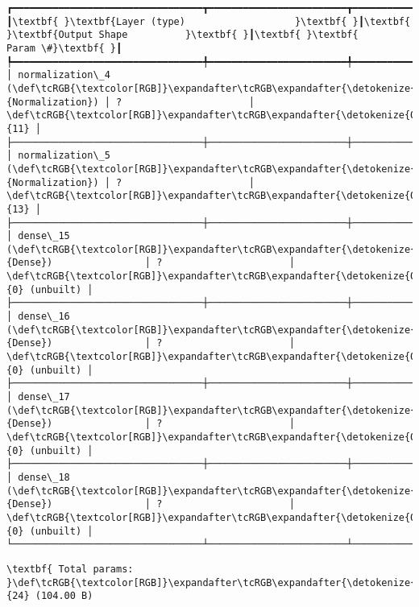 \documentclass[12pt letter]{report}
\begin{document}
    \begin{Verbatim}[commandchars=\\\{\}]
┏━━━━━━━━━━━━━━━━━━━━━━━━━━━━━━━━━┳━━━━━━━━━━━━━━━━━━━━━━━━┳━━━━━━━━━━━━━━━┓
┃\textbf{ }\textbf{Layer (type)                   }\textbf{ }┃\textbf{ }\textbf{Output Shape          }\textbf{ }┃\textbf{ }\textbf{      Param \#}\textbf{ }┃
┡━━━━━━━━━━━━━━━━━━━━━━━━━━━━━━━━━╇━━━━━━━━━━━━━━━━━━━━━━━━╇━━━━━━━━━━━━━━━┩
│ normalization\_4 (\def\tcRGB{\textcolor[RGB]}\expandafter\tcRGB\expandafter{\detokenize{0,135,255}}{Normalization}) │ ?                      │            \def\tcRGB{\textcolor[RGB]}\expandafter\tcRGB\expandafter{\detokenize{0,175,0}}{11} │
├─────────────────────────────────┼────────────────────────┼───────────────┤
│ normalization\_5 (\def\tcRGB{\textcolor[RGB]}\expandafter\tcRGB\expandafter{\detokenize{0,135,255}}{Normalization}) │ ?                      │            \def\tcRGB{\textcolor[RGB]}\expandafter\tcRGB\expandafter{\detokenize{0,175,0}}{13} │
├─────────────────────────────────┼────────────────────────┼───────────────┤
│ dense\_15 (\def\tcRGB{\textcolor[RGB]}\expandafter\tcRGB\expandafter{\detokenize{0,135,255}}{Dense})                │ ?                      │   \def\tcRGB{\textcolor[RGB]}\expandafter\tcRGB\expandafter{\detokenize{0,175,0}}{0} (unbuilt) │
├─────────────────────────────────┼────────────────────────┼───────────────┤
│ dense\_16 (\def\tcRGB{\textcolor[RGB]}\expandafter\tcRGB\expandafter{\detokenize{0,135,255}}{Dense})                │ ?                      │   \def\tcRGB{\textcolor[RGB]}\expandafter\tcRGB\expandafter{\detokenize{0,175,0}}{0} (unbuilt) │
├─────────────────────────────────┼────────────────────────┼───────────────┤
│ dense\_17 (\def\tcRGB{\textcolor[RGB]}\expandafter\tcRGB\expandafter{\detokenize{0,135,255}}{Dense})                │ ?                      │   \def\tcRGB{\textcolor[RGB]}\expandafter\tcRGB\expandafter{\detokenize{0,175,0}}{0} (unbuilt) │
├─────────────────────────────────┼────────────────────────┼───────────────┤
│ dense\_18 (\def\tcRGB{\textcolor[RGB]}\expandafter\tcRGB\expandafter{\detokenize{0,135,255}}{Dense})                │ ?                      │   \def\tcRGB{\textcolor[RGB]}\expandafter\tcRGB\expandafter{\detokenize{0,175,0}}{0} (unbuilt) │
└─────────────────────────────────┴────────────────────────┴───────────────┘

    \end{Verbatim}

    
    
    \begin{Verbatim}[commandchars=\\\{\}]
\textbf{ Total params: }\def\tcRGB{\textcolor[RGB]}\expandafter\tcRGB\expandafter{\detokenize{0,175,0}}{24} (104.00 B)

    \end{Verbatim}
\end{document}

